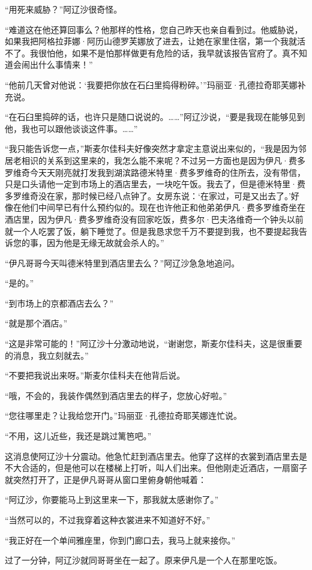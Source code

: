 \par “用死来威胁？”阿辽沙很奇怪。
\par “难道这在他还算回事么？他那样的性格，您自己昨天也亲自看到过。他威胁说，如果我把阿格拉菲娜·阿历山德罗芙娜放了进去，让她在家里住宿，第一个我就活不了。我很怕他，如果不是怕那样做更有危险的话，我早就该报告官府了。真不知道会闹出什么事情来！”
\par “他前几天曾对他说：‘我要把你放在石臼里捣得粉碎。’”玛丽亚·孔德拉奇耶芙娜补充说。
\par “在石臼里捣碎的话，也许只是随口说说的。……”阿辽沙说，“要是我现在能够见到他，我也可以跟他谈谈这件事。……”
\par “我只能告诉您一点，”斯麦尔佳科夫好像突然才拿定主意说出来似的，“我是因为邻居老相识的关系到这里来的，我怎么能不来呢？不过另一方面也是因为伊凡·费多罗维奇今天天刚亮就打发我到湖滨路德米特里·费多罗维奇的住所去，没有带信，只是口头请他一定到市场上的酒店里去，一块吃午饭。我去了，但是德米特里·费多罗维奇没在家，那时候已经八点钟了。女房东说：‘在家过，可是又出去了。’好像在他们中间早已有什么预约似的。现在也许他正和他弟弟伊凡·费多罗维奇坐在酒店里，因为伊凡·费多罗维奇没有回家吃饭，费多尔·巴夫洛维奇一个钟头以前就一个人吃罢了饭，躺下睡觉了。但是我恳求您千万不要提到我，也不要提起我告诉您的事，因为他是无缘无故就会杀人的。”
\par “伊凡哥哥今天叫德米特里到酒店里去么？”阿辽沙急急地追问。
\par “是的。”
\par “到市场上的京都酒店去么？”
\par “就是那个酒店。”
\par “这是非常可能的！”阿辽沙十分激动地说，“谢谢您，斯麦尔佳科夫，这是很重要的消息，我立刻就去。”
\par “不要把我说出来呀。”斯麦尔佳科夫在他背后说。
\par “哦，不会的，我装作偶然到酒店里去的样子，您放心好啦。”
\par “您往哪里走？让我给您开门。”玛丽亚·孔德拉奇耶芙娜连忙说。
\par “不用，这儿近些，我还是跳过篱笆吧。”
\par 这消息使阿辽沙十分震动。他急忙赶到酒店里去。他穿了这样的衣裳到酒店里去是不大合适的，但是他可以在楼梯上打听，叫人们出来。但他刚走近酒店，一扇窗子就突然打开了，正是伊凡哥哥从窗口里俯身朝他喊着：
\par “阿辽沙，你要能马上到这里来一下，那我就太感谢你了。”
\par “当然可以的，不过我穿着这种衣裳进来不知道好不好。”
\par “我正好在一个单间雅座里，你到门廊口去，我马上就来接你。”
\par 过了一分钟，阿辽沙就同哥哥坐在一起了。原来伊凡是一个人在那里吃饭。
